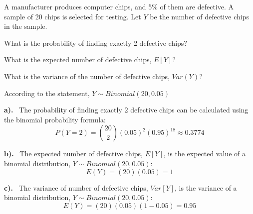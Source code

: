 \documentclass[a4paper, 10pt]{article}
\begin{document}
\begin{tosubmit}
\problem[3]
A manufacturer produces computer chips, and 5\% of them are defective.
A sample of 20 chips is selected for testing.
Let \( Y \) be the number of defective chips in the sample.
\begin{subproblems}
    \item What is the probability of finding exactly 2 defective chips?
    \item What is the expected number of defective chips, \( E[Y] \)?
    \item What is the variance of the number of defective chips, \( Var(Y) \)?
\end{subproblems}

\par\noindent\submitsolution According to the statement, \( Y \sim Binomial(20, 0.05) \)

\vspace{2mm}

\par\noindent\textbf{a).} \, The probability of finding exactly 2 defective chips
can be calculated using the binomial probability formula:
\[
    P(Y = 2) = \binom{20}{2} (0.05)^{2} (0.95)^{18} \approx \boxed{0.3774}
\]

\vspace{2mm}

\par\noindent\textbf{b).} \, The expected number of defective chips, \( E[Y] \),
is the expected value of a binomial distribution, \( Y \sim Binomial(20, 0.05) \):
\[
    E(Y) = (20)(0.05) = \boxed{1}
\]

\vspace{2mm}

\par\noindent\textbf{c).} \, The variance of  number of defective chips, \( Var[Y] \),
is the variance of a binomial distribution, \( Y \sim Binomial(20, 0.05) \):
\[
    E(Y) = (20)(0.05)(1-0.05) = \boxed{0.95}
\]
\end{tosubmit}
\end{document}
